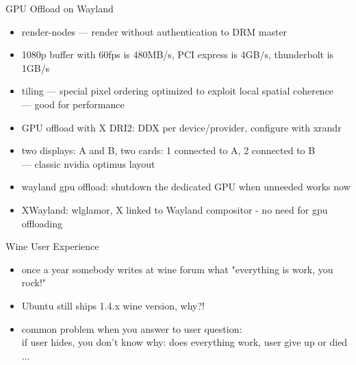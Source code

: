 \documentclass[aspectratio=169]{beamer}
\begin{document}
\begin{frame}{GPU Offload on Wayland}
  \begin{itemize}
  \item render-nodes --- render without authentication to DRM master
  \item 1080p buffer with 60fps is 480MB/s, PCI express is 4GB/s, thunderbolt is 1GB/s
  \item tiling --- special pixel ordering optimized to exploit local spatial coherence
        \\--- good for performance
  \item GPU offload with X DRI2: DDX per device/provider, configure with xrandr
  \item two displays: A and B, two cards: 1 connected to A, 2 connected to B
        \\--- classic nvidia optimus layout
  \item wayland gpu offload: shutdown the dedicated GPU when unneeded works now
  \item XWayland: wlglamor, X linked to Wayland compositor - no need for gpu offloading
  \end{itemize}
\end{frame} 

\begin{frame}{Wine User Experience}
  \begin{itemize}
  \item once a year somebody writes at wine forum what "everything is work, you rock!"
  \item Ubuntu still ships 1.4.x wine version, why?!
  \item common problem when you answer to user question:
        \\if user hides, you don't know why: does everything work, user give up or died ...
  \end{itemize}
\end{frame} 
 
\end{document}
